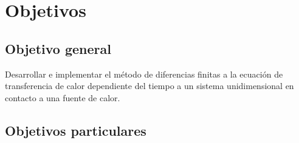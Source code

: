 \section{Objetivos}

\subsection{Objetivo general}

Desarrollar e implementar el método de diferencias finitas a la ecuación de transferencia de calor dependiente del tiempo a un sistema unidimensional en contacto a una fuente de calor.

\subsection{Objetivos particulares}



